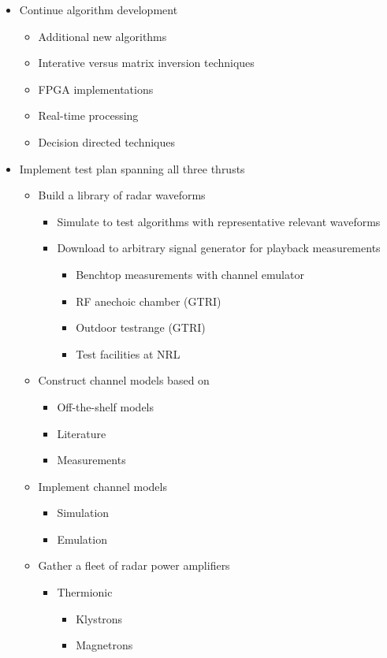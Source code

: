 \begin{itemize}
\item Continue algorithm development
\begin{itemize}
\item Additional new algorithms
\item Interative versus matrix inversion techniques
\item FPGA implementations
\item Real-time processing
\item Decision directed techniques
\end{itemize}
\item Implement test plan spanning all three thrusts
\begin{itemize}
\item Build a library of radar waveforms
\begin{itemize}
\item Simulate to test algorithms with representative relevant waveforms
\item Download to arbitrary signal generator for playback measurements
\begin{itemize}
\item Benchtop measurements with channel emulator
\item RF anechoic chamber (GTRI)
\item Outdoor testrange (GTRI)
\item Test facilities at NRL
\end{itemize}
\end{itemize}
\item Construct channel models based on
\begin{itemize}
\item Off-the-shelf models
\item Literature
\item Measurements
\end{itemize}
\item Implement channel models 
\begin{itemize}
\item Simulation
\item Emulation
\end{itemize}
\item Gather a fleet of radar power amplifiers
\begin{itemize}
\item Thermionic
\begin{itemize}
\item Klystrons
\item Magnetrons

\end{itemize}
\end{itemize}
\end{itemize}
\end{itemize}
